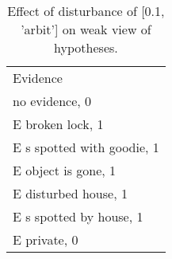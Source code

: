 \begin{table}\begin{tabular}{l}\toprule\multirow{2}{*}{Evidence} \\\\\midrule
no evidence, 0 & \\E broken lock, 1 & \\E s spotted with goodie, 1 & \\E object is gone, 1 & \\E disturbed house, 1 & \\E s spotted by house, 1 & \\E private, 0 & \\\bottomrule\end{tabular}\caption{Effect of disturbance of [0.1, 'arbit'] on weak view of hypotheses.}\end{table}